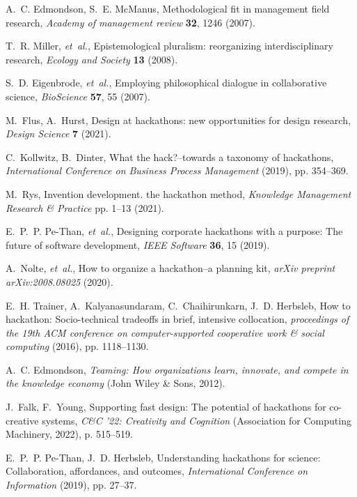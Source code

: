 \documentclass{ieeeaccess}
\begin{document}
\begin{thebibliography}{10}
A.~C. Edmondson, S.~E. McManus, Methodological fit in management field
  research, {\it Academy of management review\/} {\bf 32}, 1246 (2007).

T.~R. Miller, {\it et~al.\/}, Epistemological pluralism: reorganizing
  interdisciplinary research, {\it Ecology and Society\/} {\bf 13} (2008).

S.~D. Eigenbrode, {\it et~al.\/}, Employing philosophical dialogue in
  collaborative science, {\it BioScience\/} {\bf 57}, 55 (2007).

M.~Flus, A.~Hurst, Design at hackathons: new opportunities for design research,
  {\it Design Science\/} {\bf 7} (2021).

C.~Kollwitz, B.~Dinter, What the hack?--towards a taxonomy of hackathons, {\it
  International Conference on Business Process Management\/} (2019), pp.
  354--369.

M.~Rys, Invention development. the hackathon method, {\it Knowledge Management
  Research \& Practice\/} pp. 1--13 (2021).

E.~P.~P. Pe-Than, {\it et~al.\/}, Designing corporate hackathons with a
  purpose: The future of software development, {\it IEEE Software\/} {\bf 36},
  15 (2019).

A.~Nolte, {\it et~al.\/}, How to organize a hackathon--a planning kit, {\it
  arXiv preprint arXiv:2008.08025\/}  (2020).

E.~H. Trainer, A.~Kalyanasundaram, C.~Chaihirunkarn, J.~D. Herbsleb, How to
  hackathon: Socio-technical tradeoffs in brief, intensive collocation, {\it
  proceedings of the 19th ACM conference on computer-supported cooperative work
  \& social computing\/} (2016), pp. 1118--1130.

A.~C. Edmondson, {\it Teaming: How organizations learn, innovate, and compete
  in the knowledge economy\/} (John Wiley \& Sons, 2012).

J.~Falk, F.~Young, Supporting fast design: The potential of hackathons for
  co-creative systems, {\it C\&C '22: Creativity and Cognition\/} (Association
  for Computing Machinery, 2022), p. 515–519.

E.~P.~P. Pe-Than, J.~D. Herbsleb, Understanding hackathons for science:
  Collaboration, affordances, and outcomes, {\it International Conference on
  Information\/} (2019), pp. 27--37.


\end{thebibliography}
\end{document}
